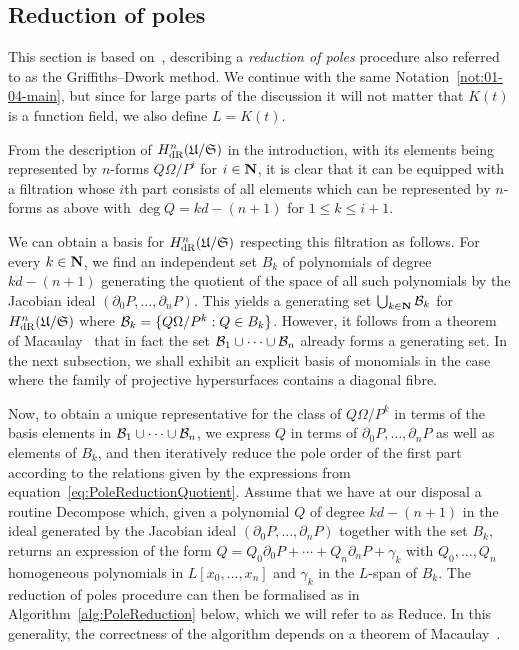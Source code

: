 \subsection{Reduction of poles}
\label{sec:01-04-reduction}

This section is based on~\citep[Remark~3.2.5]{AbbottKedlayaRoe2006}, 
describing a \emph{reduction of poles} procedure also referred to as the 
Griffiths--Dwork method.  We continue with the same 
Notation~\ref{not:01-04-main}, but since for large parts of the discussion 
it will not matter that $K(t)$ is a function field, we also define $L = K(t)$.

From the description of $H_{\text{dR}}^n(\mathfrak{U}/\mathfrak{S})$ in the 
introduction, with its elements being represented by $n$-forms 
$Q \Omega / P^i$ for $i \in \mathbf{N}$, it is clear that it can be equipped 
with a filtration whose $i$th part consists of all elements which can 
be represented by $n$-forms as above with $\deg Q = k d - (n+1)$ for 
$1 \leq k \leq i+1$.

We can obtain a basis for $H_{\text{dR}}^n(\mathfrak{U}/\mathfrak{S})$ 
respecting this filtration as follows.  For every $k \in \mathbf{N}$, we find 
an independent set $B_k$ of polynomials of degree $kd-(n+1)$ generating 
the quotient of the space of all such polynomials by the Jacobian ideal 
$(\partial_0 P, \dotsc, \partial_n P)$.  This yields a generating set 
$\bigcup_{k \in \mathbf{N}} \mathcal{B}_k$ for $H_{\text{dR}}^n(\mathfrak{U}/\mathfrak{S})$ where 
$\mathcal{B}_k = \{Q \Omega / P^k : Q \in B_k\}$.  However, it follows from a 
theorem of Macaulay~\citep[\S 4, (4.11)]{Griffiths1969} that in fact 
the set $\mathcal{B}_1 \cup \dotsb \cup \mathcal{B}_n$ already forms a generating set.  In 
the next subsection, we shall exhibit an explicit basis of monomials in the 
case where the family of projective hypersurfaces contains a diagonal fibre.

Now, to obtain a unique representative for the class of $Q \Omega / P^k$ 
in terms of the basis elements in $\mathcal{B}_1 \cup \dotsb \cup \mathcal{B}_n$, we 
express $Q$ in terms of $\partial_0 P, \dotsc, \partial_n P$ as well as 
elements of $B_k$, and then iteratively reduce the pole order of the first 
part according to the relations given by the expressions from 
equation~\eqref{eq:PoleReductionQuotient}.  Assume that we have at our 
disposal a routine {\sc Decompose} which, given a polynomial $Q$ of degree 
$kd - (n+1)$ in the ideal generated by the Jacobian ideal 
$(\partial_0 P, \dotsc, \partial_n P)$ together with the set $B_k$, returns an 
expression of the form 
$Q = Q_0 \partial_0 P + \dotsb + Q_n \partial_n P + \gamma_k$ with 
$Q_0, \dotsc, Q_n$ homogeneous polynomials in $L[x_0, \dotsc, x_n]$ and 
$\gamma_k$ in the $L$-span of $B_k$.  The reduction of poles procedure can 
then be formalised as in Algorithm~\ref{alg:PoleReduction} below, which we 
will refer to as {\sc Reduce}.  In this generality, the correctness of the 
algorithm depends on a theorem of Macaulay~\citep[\S 4, (4.11)]{Griffiths1969}.

